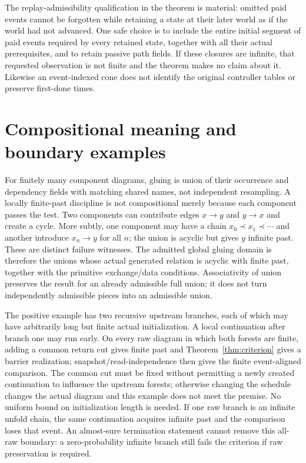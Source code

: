 \documentclass{article}
\begin{document}
The replay-admissibility qualification in the theorem is material: omitted paid events cannot be forgotten while retaining a state at their later world as if the world had not advanced. One safe choice is to include the entire initial segment of paid events required by every retained state, together with all their actual prerequisites, and to retain passive path fields. If these closures are infinite, that requested observation is not finite and the theorem makes no claim about it. Likewise an event-indexed cone does not identify the original controller tables or preserve first-done times.

\section{Compositional meaning and boundary examples}
For finitely many component diagrams, gluing is union of their occurrence and dependency fields with matching shared names, not independent resampling. A locally finite-past discipline is not compositional merely because each component passes the test. Two components can contribute edges $x\to y$ and $y\to x$ and create a cycle. More subtly, one component may have a chain $x_0\prec x_1\prec\cdots$ and another introduce $x_n\to y$ for all $n$; the union is acyclic but gives $y$ infinite past. These are distinct failure witnesses. The admitted global gluing domain is therefore the unions whose actual generated relation is acyclic with finite past, together with the primitive exchange/data conditions. Associativity of union preserves the result for an already admissible full union; it does not turn independently admissible pieces into an admissible union.

The positive example has two recursive upstream branches, each of which may have arbitrarily long but finite actual initialization. A local continuation after branch one may run early. On every raw diagram in which both forests are finite, adding a common return cut gives finite past and Theorem~\ref{thm:criterion} gives a barrier realization; snapshot/read-independence then gives the finite event-aligned comparison. The common cut must be fixed without permitting a newly created continuation to influence the upstream forests; otherwise changing the schedule changes the actual diagram and this example does not meet the premise. No uniform bound on initialization length is needed. If one raw branch is an infinite unfold chain, the same continuation acquires infinite past and the comparison loses that event. An almost-sure termination statement cannot remove this all-raw boundary: a zero-probability infinite branch still fails the criterion if raw preservation is required.
\end{document}
